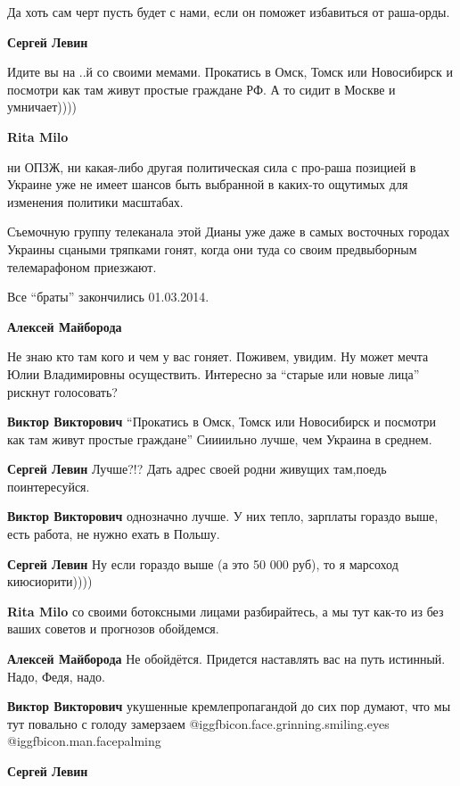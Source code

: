 \begin{itemize}
\begin{itemize}
Да хоть сам черт пусть будет с нами, если он поможет избавиться от раша-орды.

\textbf{Сергей Левин} 

Идите вы на ..й со своими мемами. Прокатись в Омск, Томск или Новосибирск и
посмотри как там живут простые граждане РФ. А то сидит в Москве и умничает))))

\textbf{Rita Milo} 

ни ОПЗЖ, ни какая-либо другая политическая сила с про-раша позицией в Украине
уже не имеет шансов быть выбранной в каких-то ощутимых для изменения политики
масштабах.

Съемочную группу телеканала этой Дианы уже даже в самых восточных городах
Украины сцаными тряпками гонят, когда они туда со своим предвыборным
телемарафоном приезжают.

Все \enquote{браты} закончились 01.03.2014.

\textbf{Алексей Майборода} 

Не знаю кто там кого и чем у вас гоняет. Поживем, увидим. Ну может мечта Юлии
Владимировны осуществить. Интересно за \enquote{старые или новые лица} рискнут
голосовать?

\textbf{Виктор Викторович} \enquote{Прокатись в Омск, Томск или Новосибирск и посмотри как там живут простые граждане}
Сиииильно лучше, чем Украина в среднем.

\textbf{Сергей Левин} Лучше?!? Дать адрес своей родни живущих там,поедь поинтересуйся.

\textbf{Виктор Викторович} однозначно лучше. У них тепло, зарплаты гораздо выше, есть работа, не нужно ехать в Польшу.

\textbf{Сергей Левин} Ну если гораздо выше (а это 50 000 руб), то я марсоход киюсиорити))))

\textbf{Rita Milo} со своими ботоксными лицами разбирайтесь, а мы тут как-то из без ваших советов и прогнозов обойдемся.

\textbf{Алексей Майборода} Не обойдётся. Придется наставлять вас на путь истинный. Надо, Федя, надо.

\textbf{Виктор Викторович} укушенные кремлепропагандой до сих пор думают, что мы тут повально с голоду замерзаем @igg{fbicon.face.grinning.smiling.eyes}  @igg{fbicon.man.facepalming} 

\textbf{Сергей Левин} 


\end{itemize}
\end{itemize}
